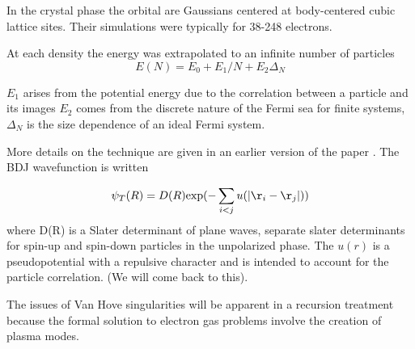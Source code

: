 In the crystal phase the orbital are Gaussians centered 
at body-centered cubic lattice sites. Their simulations were typically 
for 38-248 electrons.

At each density the energy was extrapolated to an infinite number of particles
%
\begin{equation}
E(N) = E_{0} + E_{1}/N + E_{2}\Delta_{N}
\end{equation}

$E_{1}$ arises from the potential energy due to the correlation between a particle and its images
$E_{2}$ comes from the discrete nature of the Fermi sea for finite systems, $\Delta_{N}$ is the 
size dependence of an ideal Fermi system.

More details on the technique are given in an earlier version of the paper
\cite{ceperley78}. The BDJ wavefunction is written

\begin{equation}
\psi_{T}(R) = D(R) {\rm exp}(-\sum_{i<j} u(|\r_{i}-\r_{j}|))
\end{equation}
%
where D(R) is a Slater determinant of plane waves, separate slater determinants for
spin-up and spin-down particles in the unpolarized phase. The $u(r)$ is a pseudopotential
with a repulsive character and is intended to account for the particle correlation. 
(We will come back to this).

The issues of Van Hove singularities will be apparent in a recursion treatment because 
the formal solution to electron gas problems involve the creation of plasma modes.


